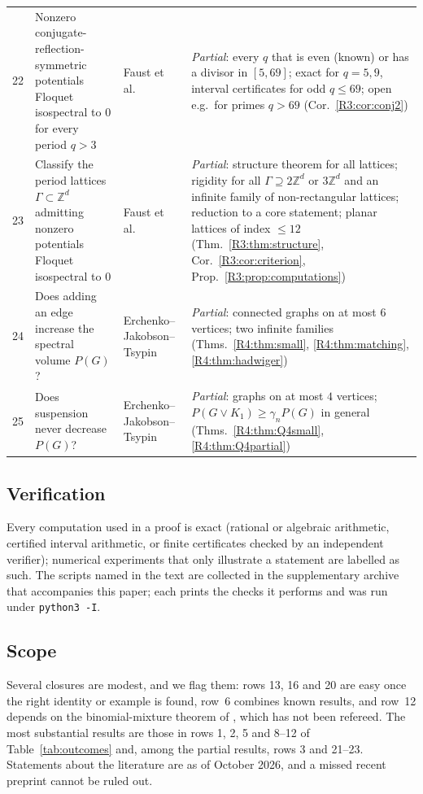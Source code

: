 \documentclass[11pt]{amsart}
\theoremstyle{definition}
\theoremstyle{remark}
\providecommand{\Z}{\mathbb Z}
\begin{document}
{\begin{longtable}{@{}p{}>{\raggedright\arraybackslash}p{}>{\raggedright\arraybackslash}p{}>{\raggedright\arraybackslash}p{}@{}}
22 & Nonzero conjugate-reflection-symmetric potentials Floquet isospectral to $0$ for every period $q>3$ & Faust et al.\ \cite[Conj.~2]{R3-FFORS} & \emph{Partial}: every $q$ that is even (known) or has a divisor in $[5,69]$; exact for $q=5,9$, interval certificates for odd $q\le69$; open e.g.\ for primes $q>69$ (Cor.~\ref{R3:cor:conj2})\\
23 & Classify the period lattices $\Gamma\subset\Z^d$ admitting nonzero potentials Floquet isospectral to $0$ & Faust et al.\ \cite[Problem~1]{R3-FFORS} & \emph{Partial}: structure theorem for all lattices; rigidity for all $\Gamma\supseteq2\Z^d$ or $3\Z^d$ and an infinite family of non-rectangular lattices; reduction to a core statement; planar lattices of index $\le12$ (Thm.~\ref{R3:thm:structure}, Cor.~\ref{R3:cor:criterion}, Prop.~\ref{R3:prop:computations})\\
24 & Does adding an edge increase the spectral volume $P(G)$? & Erchenko--Jakobson--Tsypin \cite{R4-EJT} & \emph{Partial}: connected graphs on at most $6$ vertices; two infinite families (Thms.~\ref{R4:thm:small}, \ref{R4:thm:matching}, \ref{R4:thm:hadwiger})\\
25 & Does suspension never decrease $P(G)$? & Erchenko--Jakobson--Tsypin \cite{R4-EJT} & \emph{Partial}: graphs on at most $4$ vertices; $P(G\vee K_1)\ge\gamma_nP(G)$ in general (Thms.~\ref{R4:thm:Q4small}, \ref{R4:thm:Q4partial})\\
\end{longtable}
}

\subsection{Verification}
Every computation used in a proof is exact (rational or algebraic
arithmetic, certified interval arithmetic, or finite certificates checked
by an independent verifier); numerical experiments that only illustrate a
statement are labelled as such. The scripts named in the text are collected
in the supplementary archive that accompanies this paper; each prints the
checks it performs and was run under \texttt{python3 -I}.

\subsection{Scope}
Several closures are modest, and we flag them: rows 13, 16 and 20 are easy
once the right identity or example is found, row~6 combines known results,
and row~12 depends on the binomial-mixture theorem of \cite{K-029}, which
has not been refereed. The most substantial results are those in rows 1, 2,
5 and 8--12 of Table~\ref{tab:outcomes} and, among the partial results, rows
3 and 21--23. Statements about the literature are as of October 2026, and a
missed recent preprint cannot be ruled out.
\end{document}
